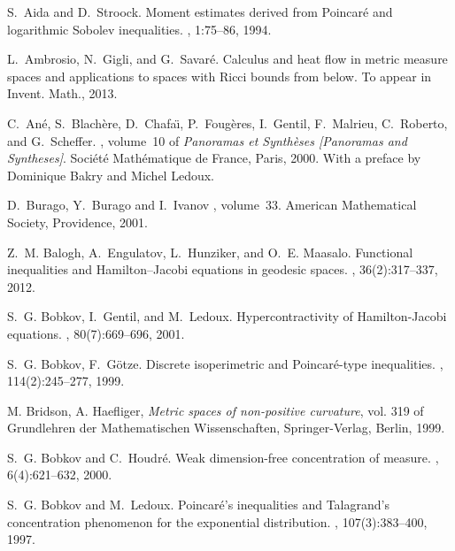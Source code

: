 \documentclass[11pt]{amsart}
\numberwithin{equation}{section}
\begin{document}
\begin{thebibliography}{10}

S.~Aida and D.~Stroock.
\newblock Moment estimates derived from {P}oincar\'e and logarithmic {S}obolev
  inequalities.
, 1:75--86, 1994.

L.~{Ambrosio}, N.~{Gigli}, and G.~{Savar{\'e}}.
\newblock Calculus and heat flow in metric measure spaces and applications to
  spaces with {R}icci bounds from below.
\newblock To appear in Invent. Math., 2013.

C.~An{\'e}, S.~Blach{\`e}re, D.~Chafa{\"{\i}}, P.~Foug{\`e}res, I.~Gentil,
  F.~Malrieu, C.~Roberto, and G.~Scheffer.
, volume~10
  of {\em Panoramas et Synth\`eses [Panoramas and Syntheses]}.
\newblock Soci\'et\'e Math\'ematique de France, Paris, 2000.
\newblock With a preface by Dominique Bakry and Michel Ledoux.

D.~Burago, Y.~Burago and I.~Ivanov
, volume~33.
\newblock American Mathematical Society, Providence, 2001.

Z.~M. Balogh, A.~Engulatov, L.~Hunziker, and O.~E. Maasalo.
\newblock Functional inequalities and {H}amilton--{J}acobi equations in
  geodesic spaces.
, 36(2):317--337, 2012.

S.~G. Bobkov, I.~Gentil, and M.~Ledoux.
\newblock Hypercontractivity of {H}amilton-{J}acobi equations.
, 80(7):669--696, 2001.

S.~G. Bobkov, F.~G{\"o}tze.
\newblock Discrete isoperimetric and Poincar\'e-type inequalities.
, 114(2):245--277, 1999.

 M. Bridson, A. Haefliger, \emph{Metric spaces of non-positive curvature}, vol. 319 of Grundlehren der Mathematischen Wissenschaften, Springer-Verlag, Berlin, 1999.

S.~G. Bobkov and C.~Houdr{\'e}.
\newblock Weak dimension-free concentration of measure.
, 6(4):621--632, 2000.

S.~G. Bobkov and M.~Ledoux.
\newblock Poincar\'e's inequalities and {T}alagrand's concentration phenomenon
  for the exponential distribution.
, 107(3):383--400, 1997.


\end{thebibliography}
\end{document}
